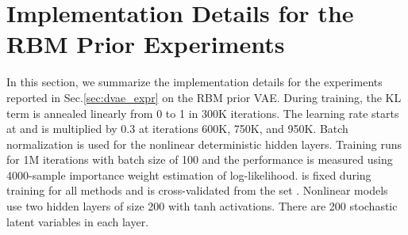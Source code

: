 \documentclass{article}
\begin{document}
\fi

\section{Implementation Details for the RBM Prior Experiments} \label{app:rbm_details}

In this section, we summarize the implementation details for the experiments reported in Sec.\ref{sec:dvae_expr} on the RBM prior VAE. 
During training, the KL term is annealed linearly from 0 to 1 in 300K iterations. The learning rate starts at  and is multiplied by 
0.3 at iterations 600K, 750K, and 950K. 
Batch normalization is used for the nonlinear deterministic hidden layers. Training runs for 1M iterations 
with batch size of 100 and the performance is measured using 4000-sample importance weight estimation of log-likelihood. 
 is fixed during training for all methods and is cross-validated from the set . 
Nonlinear models use two hidden layers of size 200 with tanh activations. 
There are 200 stochastic latent variables in each layer. 
\end{document}
